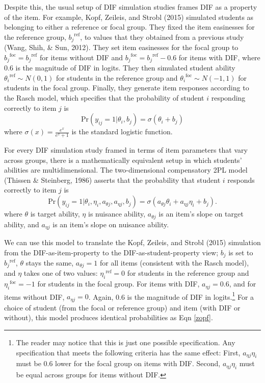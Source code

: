 \documentclass[
  english,
  man,floatsintext]{apa6}
\begin{document}
Despite this, the usual setup of DIF simulation studies frames DIF as a property of the item. For example, Kopf, Zeileis, and Strobl (2015) simulated students as belonging to either a reference or focal group. They fixed the item easinesses for the reference group, \({b_j}^{\text{ref}}\), to values that they obtained from a previous study (Wang, Shih, \& Sun, 2012). They set item easinesses for the focal group to \({b_j}^{\text{foc}} = {b_j}^{\text{ref}}\) for items without DIF and \({b_j}^{\text{foc}} = {b_j}^{\text{ref}} - 0.6\) for items with DIF, where 0.6 is the magnitude of DIF in logits. They then simulated student ability \({\theta_i}^{\text{ref}} \sim N(0,1)\) for students in the reference group and \({\theta_i}^{\text{foc}} \sim N(-1,1)\) for students in the focal group. Finally, they generate item responses according to the Rasch model, which specifies that the probability of student \(i\) responding correctly to item \(j\) is
\begin{equation}
\text{Pr}(y_{ij} = 1 | \theta_i, b_j) = \sigma(\theta_i + b_j) \label{zopf}
\end{equation}
where \(\sigma(x) = \frac{e^x}{e^x + 1}\) is the standard logistic function.

For every DIF simulation study framed in terms of item parameters that vary across groups, there is a mathematically equivalent setup in which students' abilities are multidimensional. The two-dimensional compensatory 2PL model (Thissen \& Steinberg, 1986) asserts that the probability that student \(i\) responds correctly to item \(j\) is
\begin{equation}
\text{Pr}(y_{ij} = 1 | \theta_i, \eta_i, a_{\theta j}, a_{\eta j}, b_j) = \sigma(a_{\theta j}\theta_i + a_{\eta j}\eta_i + b_j).
\end{equation}
where \(\theta\) is target ability, \(\eta\) is nuisance ability, \(a_{\theta j}\) is an item's slope on target ability, and \(a_{\eta j}\) is an item's slope on nuisance ability.

We can use this model to translate the Kopf, Zeileis, and Strobl (2015) simulation from the DIF-as-item-property to the DIF-as-student-property view; \(b_j\) is set to \({b_j}^{\text{ref}}\), \(\theta\) stays the same, \(a_{\theta j} = 1\) for all items (consistent with the Rasch model), and \(\eta\) takes one of two values: \({\eta_i}^{\text{ref}} = 0\) for students in the reference group and \({\eta_i}^{\text{foc}} = -1\) for students in the focal group. For items with DIF, \(a_{\eta j} = 0.6\), and for items without DIF, \(a_{\eta j} = 0\). Again, 0.6 is the magnitude of DIF in logits.\footnote{The reader may notice that this is just one possible specification. Any specification that meets the following criteria has the same effect: First, \(a_{\eta j}\eta_i\) must be 0.6 lower for the focal group on items with DIF. Second, \(a_{\eta j}\eta_i\) must be equal across groups for items without DIF.} For a choice of student (from the focal or reference group) and item (with DIF or without), this model produces identical probabilities as Eqn \ref{zopf}.
\end{document}
